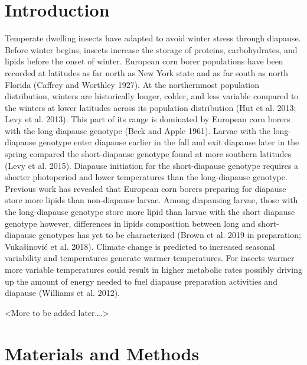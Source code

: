 \documentclass[review]{elsarticle}
\begin{document}
\linenumbers



\section{Introduction}
Temperate dwelling insects have adapted to avoid winter stress through diapause. Before winter begins, insects increase the storage of proteins, carbohydrates, and lipids before the onset of winter. European corn borer populations have been recorded at latitudes as far north as New York state and as far south as north Florida (Caffrey and Worthley 1927).  At the northernmost population distribution, winters are historically longer, colder, and less variable compared to the winters at lower latitudes across its population distribution (Hut et al. 2013; Levy et al. 2013). This part of its range is dominated by European corn borers with the long diapause genotype (Beck and Apple 1961). Larvae with the long-diapause genotype enter diapause earlier in the fall and exit diapause later in the spring compared the short-diapause genotype found at more southern latitudes (Levy et al. 2015). Diapause initiation for the short-diapause genotype requires a shorter photoperiod and lower temperatures than the long-diapause genotype. Previous work has revealed that European corn borers preparing for diapause store more lipids than non-diapause larvae. Among diapausing larvae, those with the long-diapause genotype store more lipid than larvae with the short diapause genotype however, differences in lipids composition between long and short-diapause genotypes has yet to be characterized (Brown et al. 2019 in preparation; Vukašinović et al. 2018).
Climate change is predicted to increased seasonal variability and temperatures  generate warmer temperatures. For insects warmer more variable temperatures could result in higher metabolic rates possibly driving up the amount of energy needed to fuel diapause preparation activities and diapause (Williams et al. 2012). 

<More to be added later….>

\section{Materials and Methods}
\end{document}

